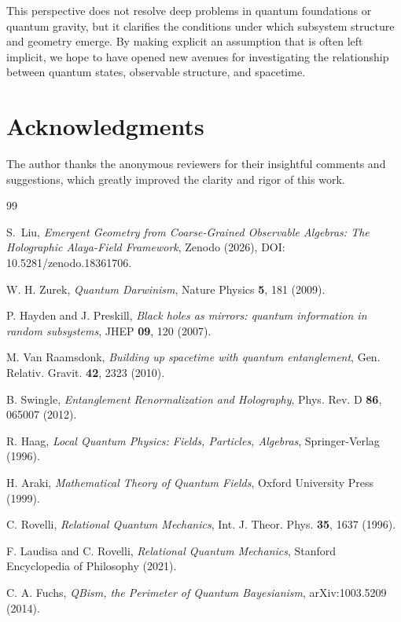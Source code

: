 \documentclass[12pt,a4paper]{article}
\begin{document}
This perspective does not resolve deep problems in quantum foundations or quantum gravity, but it clarifies the conditions under which subsystem structure and geometry emerge. By making explicit an assumption that is often left implicit, we hope to have opened new avenues for investigating the relationship between quantum states, observable structure, and spacetime.

\section*{Acknowledgments}

The author thanks the anonymous reviewers for their insightful comments and suggestions, which greatly improved the clarity and rigor of this work.

\begin{thebibliography}{99}

S.~Liu, \emph{Emergent Geometry from Coarse-Grained Observable Algebras: The Holographic Alaya-Field Framework}, Zenodo (2026), DOI: 10.5281/zenodo.18361706.

W. H. Zurek, \emph{Quantum Darwinism}, Nature Physics \textbf{5}, 181 (2009).

P. Hayden and J. Preskill, \emph{Black holes as mirrors: quantum information in random subsystems}, JHEP \textbf{09}, 120 (2007).

M. Van Raamsdonk, \emph{Building up spacetime with quantum entanglement}, Gen. Relativ. Gravit. \textbf{42}, 2323 (2010).

B. Swingle, \emph{Entanglement Renormalization and Holography}, Phys. Rev. D \textbf{86}, 065007 (2012).

R. Haag, \emph{Local Quantum Physics: Fields, Particles, Algebras}, Springer-Verlag (1996).

H. Araki, \emph{Mathematical Theory of Quantum Fields}, Oxford University Press (1999).

C. Rovelli, \emph{Relational Quantum Mechanics}, Int. J. Theor. Phys. \textbf{35}, 1637 (1996).

F. Laudisa and C. Rovelli, \emph{Relational Quantum Mechanics}, Stanford Encyclopedia of Philosophy (2021).

C. A. Fuchs, \emph{QBism, the Perimeter of Quantum Bayesianism}, arXiv:1003.5209 (2014).


\end{thebibliography}
\end{document}
